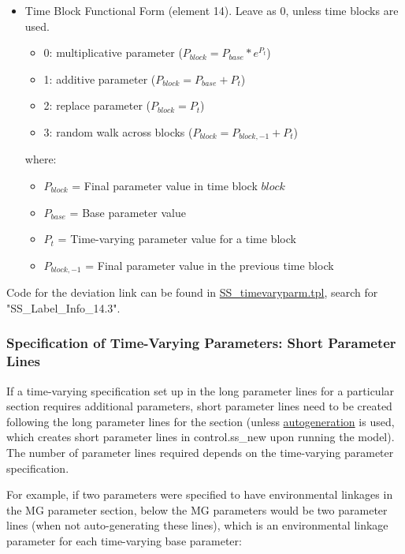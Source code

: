 \begin{itemize}
\item Time Block Functional Form (element 14). Leave as 0, unless time blocks are used.
	\begin{itemize}
		\item 0: multiplicative parameter ($P_{block} = P_{base}*e^{P_t}$)
		\item 1: additive parameter ($P_{block} = P_{base} + P_t$)
		\item 2: replace parameter ($P_{block} = P_t$)
		\item 3: random walk across blocks ($P_{block} = P_{block,-1} + P_t$)
	\end{itemize}
	where:
	\begin{itemize}
        \item $P_{block}$ = Final parameter value in time block $block$
        \item $P_{base}$ = Base parameter value
		\item $P_{t}$ = Time-varying parameter value for a time block
		\item $P_{block,-1}$ = Final parameter value in the previous time block
     \end{itemize}
\end{itemize}


Code for the deviation link can be found in \href{https://github.com/nmfs-stock-synthesis/stock-synthesis/blob/main/SS_timevaryparm.tpl}{SS\_timevaryparm.tpl}, search for "SS\_Label\_Info\_14.3".


\subsubsection{Specification of Time-Varying Parameters: Short Parameter Lines} 

If a time-varying specification set up in the long parameter lines for a particular section requires additional parameters, short parameter lines need to be created following the long parameter lines for the section (unless \hyperlink{autogen}{autogeneration} is used, which creates short parameter lines in control.ss\_new upon running the model). The number of parameter lines required depends on the time-varying parameter specification.

For example, if two parameters were specified to have environmental linkages in the MG parameter section, below the MG parameters would be two parameter lines (when not auto-generating these lines), which is an environmental linkage parameter for each time-varying base parameter:

